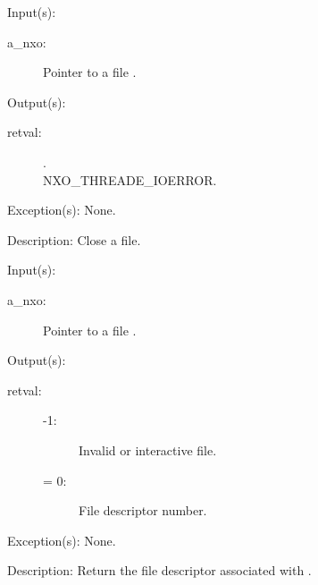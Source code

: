 \begin{capi}
	\begin{capilist}
	\item[Input(s): ]
		\begin{description}\item[]
		\item[a\_nxo: ]
			Pointer to a file .
		\end{description}
	\item[Output(s): ]
		\begin{description}\item[]
		\item[retval: ]
			\begin{description}\item[]
			\item[.]
			\item[
				{NXO_THREADE_IOERROR}.]
			\end{description}
		\end{description}
	\item[Exception(s): ] None.
	\item[Description: ]
		Close a file.
	\end{capilist}
\label{nxo_file_fd_get}
	\begin{capilist}
	\item[Input(s): ]
		\begin{description}\item[]
		\item[a\_nxo: ]
			Pointer to a file \classname{nxo}.
		\end{description}
	\item[Output(s): ]
		\begin{description}\item[]
		\item[retval: ]
			\begin{description}\item[]
			\item[-1: ]
				Invalid or interactive file.
			\item[{\gt}= 0: ]
				File descriptor number.
			\end{description}
		\end{description}
	\item[Exception(s): ] None.
	\item[Description: ]
		Return the file descriptor associated with \cvar{a\_nxo}.

\end{capilist}
\end{capi}
